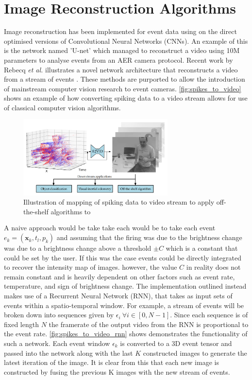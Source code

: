 \section{Image Reconstruction Algorithms} \label{ssec:image_reconstruction}

Image reconstruction has been implemented for event data using on the direct optimised versions of Convolutional Neural Networks (CNNs). An example of this is the network named 'U-net'\cite{UNET} which managed to reconstruct a video using 10M parameters to analyse events from an AER camera protocol. Recent work by Rebecq \textit{et al.} illustrates a novel network architecture that reconstructs a video from a stream of events \cite{spikingToVideo}. These methods are purported to allow the introduction of mainstream computer vision research to event cameras. \autoref{fig:spikes_to_video} shows an example of how converting spiking data to a video stream allows for use of classical computer vision algorithms.

\begin{figure}[htb]
      \centering
      \includegraphics[width=0.7\textwidth]{background/images/spikes_to_video.png}
      \caption{Illustration of mapping of spiking data to video stream to apply off-the-shelf algorithms to\cite{spikingToVideo}}
      \label{fig:spikes_to_video}
\end{figure}

A naive approach would be take take each would be to take each event $ e_k = (\boldsymbol{\mathbf{x}}_k, t_l, p_k ) $ and assuming that the firing was due to the brightness change was due to a brightness change above a threshold $ \pm C $ which is a constant that could be set by the user. If this was the case events could be directly integrated to recover the intensity map of images. however, the value $ C $ in reality does not remain constant and is heavily dependent on other factors such as event rate, temperature, and sign of brightness change. The implementation outlined instead makes use of a Recurrent Neural Network (RNN), that takes as input sets of events within a spatio-temporal window. For example, a stream of events will be broken down into sequences given by $ \epsilon_i \: \forall i \in [0, N-1] $. Since each sequence is of fixed length $ N $ the framerate of the output video from the RNN is proportional to the event rate. \autoref{fig:spikes_to_video_rnn} shows demonstrates the functionality of such a network. Each event window $ \epsilon_k $ is converted to a 3D event tensor and passed into the network along with the last $ K $ constructed images to generate the latest iteration of the image. It is clear from this that each new image is constructed by fusing the previous K images with the new stream of events.

